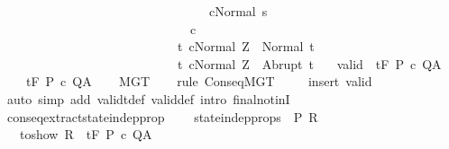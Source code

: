 \begin{isabellebody}
\ \ \ \ \ \ \ \ \ \ \ \ \ \ \ \ \ \ \ \ \ \ \ \ \ \ \ \ \ \ \ \ \ {\isasymGamma}{\isasymturnstile}c{\isasymdown}Normal\ s{\isacharbraceright}\isanewline
\ \ \ \ \ \ \ \ \ \ \ \ \ \ \ \ \ \ \ \ \ \ \ \ \ \ \ \ \ \ c\ \isanewline
\ \ \ \ \ \ \ \ \ \ \ \ \ \ \ \ \ \ \ \ \ \ \ \ \ \ \ \ {\isacharbraceleft}t{\isachardot}\ {\isasymGamma}{\isasymturnstile}{\isasymlangle}c{\isacharcomma}Normal\ Z{\isasymrangle}\ {\isasymRightarrow}\ Normal\ t{\isacharbraceright}{\isacharcomma}\isanewline
\ \ \ \ \ \ \ \ \ \ \ \ \ \ \ \ \ \ \ \ \ \ \ \ \ \ \ \ {\isacharbraceleft}t{\isachardot}\ {\isasymGamma}{\isasymturnstile}{\isasymlangle}c{\isacharcomma}Normal\ Z{\isasymrangle}\ {\isasymRightarrow}\ Abrupt\ t{\isacharbraceright}{\isachardoublequoteclose}\isanewline
\ \ \ valid{\isacharcolon}\ {\isachardoublequoteopen}{\isasymGamma}\ {\isasymTurnstile}\isactrlsub t\isactrlbsub {\isacharslash}F\isactrlesub \ P\ c\ Q{\isacharcomma}A{\isachardoublequoteclose}\ \isanewline
\ \ \ {\isachardoublequoteopen}{\isasymGamma}{\isacharcomma}{\isacharbraceleft}{\isacharbraceright}\ {\isasymturnstile}\isactrlsub t\isactrlbsub {\isacharslash}F\isactrlesub \ P\ c\ Q{\isacharcomma}A{\isachardoublequoteclose}\isanewline
%
\isadelimproof
\ \ %
\endisadelimproof
%
\isatagproof
{}\isamarkupfalse%
\ MGT\isanewline
\ \ \isamarkupfalse%
\ {\isacharparenleft}rule\ ConseqMGT{\isacharparenright}\ \isanewline
\ \ \isamarkupfalse%
\ {\isacharparenleft}insert\ valid{\isacharparenright}\isanewline
\ \ \isamarkupfalse%
\ {\isacharparenleft}auto\ simp\ add{\isacharcolon}\ validt{\isacharunderscore}def\ valid{\isacharunderscore}def\ intro{\isacharbang}{\isacharcolon}\ final{\isacharunderscore}notinI{\isacharparenright}\isanewline
\ \ \isamarkupfalse%
%
\endisatagproof
{\isafoldproof}%
%
\isadelimproof
\isanewline
%
\endisadelimproof
\isanewline
{}\isamarkupfalse%
\ conseq{\isacharunderscore}extract{\isacharunderscore}state{\isacharunderscore}indep{\isacharunderscore}prop{\isacharcolon}\ \isanewline
\ \ \ state{\isacharunderscore}indep{\isacharunderscore}prop{\isacharcolon}{\isachardoublequoteopen}{\isasymforall}s\ {\isasymin}\ P{\isachardot}\ R{\isachardoublequoteclose}\ \isanewline
\ \ \ to{\isacharunderscore}show{\isacharcolon}\ {\isachardoublequoteopen}R\ {\isasymLongrightarrow}\ {\isasymGamma}{\isacharcomma}{\isasymTheta}{\isasymturnstile}\isactrlsub t\isactrlbsub {\isacharslash}F\isactrlesub \ P\ c\ Q{\isacharcomma}A{\isachardoublequoteclose}\isanewline

\end{isabellebody}
